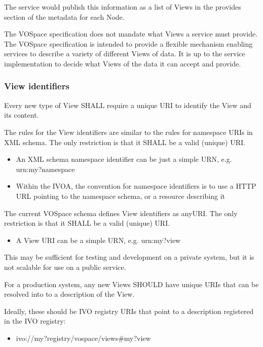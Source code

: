 \documentclass[11pt,a4paper]{ivoa}
\begin{document}
The service would publish this information as a list of Views in the provides section of the metadata for each Node.

The VOSpace specification does not mandate what Views a service must provide. The VOSpace specification is intended to provide a flexible mechanism enabling services to describe a variety of different Views of data. It is up to the service implementation to decide what Views of the data it can accept and provide.

\subsubsection{View identifiers}
Every new type of View SHALL require a unique URI to identify the View and its content.

The rules for the View identifiers are similar to the rules for namespace URIs in XML schema. The only restriction is that it SHALL be a valid (unique) URI.

\begin{itemize}
    \item An XML schema namespace identifier can be just a simple URN, e.g. urn:my?namespace
    \item Within the IVOA, the convention for namespace identifiers is to use a HTTP URL pointing to the namespace schema, or a resource describing it
\end{itemize}

The current VOSpace schema defines View identifiers as anyURI. The only restriction is that it SHALL be a valid (unique) URI.

\begin{itemize}
    \item A View URI can be a simple URN, e.g. urn:my?view
\end{itemize}

This may be sufficient for testing and development on a private system, but it is not scalable for use on a public service.

For a production system, any new Views SHOULD have unique URIs that can be resolved into to a description of the View.

Ideally, these should be IVO registry URIs that point to a description registered in the IVO registry:

\begin{itemize}
    \item ivo://my?registry/vospace/views\#my?view
\end{itemize}
\end{document}
